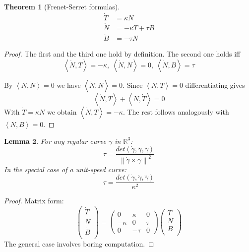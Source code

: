 \documentclass[a4paper,11pt,notitlepage,fullpage]{paper}
\newcommand{\y}{\gamma}
\newcommand{\dy}{\dot\gamma}
\newcommand{\ddy}{\ddot\gamma}
\theoremstyle{plain}
\newtheorem{thm}{Theorem}[section] %
\newtheorem{lem}[thm]{Lemma}
\theoremstyle{definition}
\begin{document}
\begin{thm}[Frenet-Serret formulas]
\begin{align*}
\dot T &= \kappa N \\
\dot N &= -\kappa T + \tau B \\
\dot B &= -\tau N
\end{align*}
\end{thm}

\begin{proof}
The first and the third one hold by definition. The second one holds iff
\[\left\langle\dot N, T\right\rangle = -\kappa,\ \left\langle\dot N, N\right\rangle = 0,\ \left\langle\dot N, B\right\rangle = \tau\]

By $\left\langle N, N\right\rangle = 0$ we have $\left\langle\dot N, N\right\rangle = 0$.
Since $\left\langle N, T\right\rangle = 0$ differentiating gives
\[ \left\langle \Dot N, T \right\rangle + \left\langle N, \dot T \right\rangle =0 \]
With $\dot T = \kappa N$ we obtain $\left\langle\dot N, T\right\rangle = -\kappa$. The rest follows analogously with $\left\langle N, B\right\rangle=0$.
\end{proof}

\begin{lem}
For any regular curve $\y$ in $\mathbb R^3$:
\begin{equation*}
\tau = \frac{det(\dy, \ddy, \dddot\gamma)}{\left\| \dy \times \ddy\right\|^2}
\end{equation*}
In the special case of a unit-speed curve:
\begin{equation*}
\tau = \frac{det(\dy, \ddy, \dddot\gamma)}{\kappa^2}
\end{equation*}
\end{lem}

\begin{proof}
Matrix form:
\[
\begin{pmatrix}
\dot T\\
\dot N\\
\dot B\\
\end{pmatrix}
=
\begin{pmatrix}
0 & \kappa & 0 \\
-\kappa & 0 & \tau\\
0  & -\tau  &  0
\end{pmatrix}
\begin{pmatrix}
T \\
N \\
B \\
\end{pmatrix}
\]
The general case involves boring computation.
\end{proof}
\end{document}
